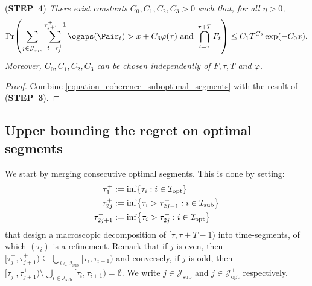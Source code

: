 \documentclass[preprint,cleveref,12pt]{colt2025}
\DeclarePairedDelimiter{\braces}{\{}{\}}	%
\DeclarePairedDelimiter{\parens}{(}{)}	%
\def\STEP#1{(\strong{STEP~#1})}
\newcommand{\strong}[1]{\textbf{#1}}
\begin{document}
    \noindent
    \STEP{4}
    \textit{
        There exist constants $C_0, C_1, C_2, C_3 > 0$ such that, for all $\eta > 0$, 
        \begin{equation}
            \Pr \parens*{
                \sum_{j \in \mathcal{J}^+_\mathrm{sub}}
                \sum_{t=\tau_j^+}^{\tau_{j+1}^+-1}
                \ogaps(\Pair_t)
                >
                x + C_3 \varphi(\tau)
                \text{~and~}
                \bigcap_{t = \tau}^{\tau+T} F_t
            }
            \le
            C_1 T^{C_2} \exp(-C_0x)
            .
        \end{equation}
        Moreover, $C_0, C_1, C_2, C_3$ can be chosen independently of $F, \tau, T$ and $\varphi$. 
    }
    \medskip
    \begin{proof}
        Combine \eqref{equation_coherence_suboptimal_segments} with the result of \STEP{3}.
    \end{proof}

    \subsection{Upper bounding the regret on optimal segments}
    \label{appendix_coherence_optimal_segments}
    
    We start by merging consecutive optimal segments. 
    This is done by setting:
    \begin{equation}
    \begin{split}
        \tau_1^+ & := \inf \braces*{\tau_i: i \in \mathcal{I}_{\mathrm{opt}}}
        \\
        \tau_{2j}^+ & := \inf \braces*{\tau_i > \tau_{2j-1}^+: i \in \mathcal{I}_\mathrm{sub}}\\
        \tau_{2j+1}^+ & := \inf \braces*{\tau_i > \tau_{2j}^+ : i \in \mathcal{I}_\mathrm{opt}}
    \end{split}
    \end{equation}
    that design a macroscopic decomposition of $[\tau, \tau+T-1)$ into time-segments, of which $(\tau_i)$ is a refinement. 
    Remark that if $j$ is even, then $[\tau_j^+, \tau_{j+1}^+) \subseteq \bigcup_{i \in \mathcal{I}_\mathrm{sub}} [\tau_i, \tau_{i+1})$ and conversely, if $j$ is odd, then $[\tau_j^+, \tau_{j+1}^+) \setminus \bigcup_{i \in \mathcal{I}_\mathrm{sub}} [\tau_i, \tau_{i+1}) = \emptyset$.
    We write $j \in \mathcal{J}^+_\mathrm{sub}$ and $j \in \mathcal{J}^+_\mathrm{opt}$ respectively. 
\end{document}
